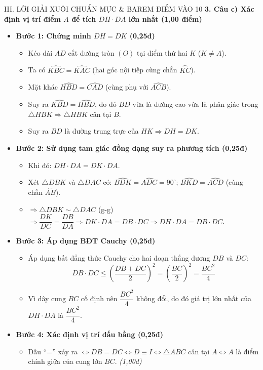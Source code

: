 \documentclass[11pt,a4paper]{article}
\begin{document}
\begin{solutionbox}{III. LỜI GIẢI XUÔI CHUẨN MỰC \& BAREM ĐIỂM VÀO 10}
\vspace{0.8mm}
\textbf{3. Câu c) Xác định vị trí điểm $A$ để tích $DH \cdot DA$ lớn nhất (1,00 điểm)}
\begin{itemize}[leftmargin=5mm]
    \item \textbf{Bước 1: Chứng minh $DH = DK$ (0,25đ)}
    \begin{itemize}
        \item Kéo dài $AD$ cắt đường tròn $(O)$ tại điểm thứ hai $K$ ($K \neq A$).
        \item Ta có $\widehat{KBC} = \widehat{KAC}$ (hai góc nội tiếp cùng chắn $\stackrel{\frown}{KC}$).
        \item Mặt khác $\widehat{HBD} = \widehat{CAD}$ (cùng phụ với $\widehat{ACB}$).
        \item Suy ra $\widehat{KBD} = \widehat{HBD}$, do đó $BD$ vừa là đường cao vừa là phân giác trong $\triangle HBK \Rightarrow \triangle HBK$ cân tại $B$.
        \item Suy ra $BD$ là đường trung trực của $HK \Rightarrow DH = DK$.
    \end{itemize}
    \item \textbf{Bước 2: Sử dụng tam giác đồng dạng suy ra phương tích (0,25đ)}
    \begin{itemize}
        \item Khi đó: $DH \cdot DA = DK \cdot DA$.
        \item Xét $\triangle DBK$ và $\triangle DAC$ có: $\widehat{BDK} = \widehat{ADC} = 90^\circ$; $\widehat{BKD} = \widehat{ACD}$ (cùng chắn $\stackrel{\frown}{AB}$).
        \item $\Rightarrow \triangle DBK \sim \triangle DAC$ (g-g) $\Rightarrow \dfrac{DK}{DC} = \dfrac{DB}{DA} \Rightarrow DK \cdot DA = DB \cdot DC \Rightarrow DH \cdot DA = DB \cdot DC$.
    \end{itemize}
    \item \textbf{Bước 3: Áp dụng BĐT Cauchy (0,25đ)}
    \begin{itemize}
        \item Áp dụng bất đẳng thức Cauchy cho hai đoạn thẳng dương $DB$ và $DC$:
        $$DB \cdot DC \le \left(\dfrac{DB + DC}{2}\right)^2 = \left(\dfrac{BC}{2}\right)^2 = \dfrac{BC^2}{4}$$
        \item Vì dây cung $BC$ cố định nên $\dfrac{BC^2}{4}$ không đổi, do đó giá trị lớn nhất của $DH \cdot DA$ là $\dfrac{BC^2}{4}$.
    \end{itemize}
    \item \textbf{Bước 4: Xác định vị trí dấu bằng (0,25đ)}
    \begin{itemize}
        \item Dấu “=” xảy ra $\iff DB = DC \iff D \equiv I \iff \triangle ABC$ cân tại $A \iff A$ là điểm chính giữa của cung lớn $BC$. \hfill \textit{(1,00đ)}
    \end{itemize}
\end{itemize}

\end{solutionbox}
\end{document}
